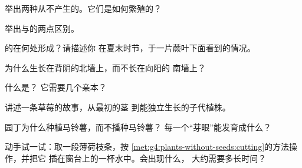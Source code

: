 \begin{exercise}[$\star$]\label{exo:g4:plants-without-seeds:1}
举出两种从不产生的。它们是如何繁殖的？
\end{exercise}

\begin{exercise}[$\star$]\label{exo:g4:plants-without-seeds:2}
举出与的两点区别。
\end{exercise}

\begin{exercise}[$\star$]\label{exo:g4:plants-without-seeds:3}
的在何处形成？请描述你
在夏末时节，于一片蕨叶下面看到的情况。
\end{exercise}

\begin{exercise}[$\star$]\label{exo:g4:plants-without-seeds:4}
为什么生长在背阴的北墙上，而不长在向阳的
南墙上？
\end{exercise}

\begin{exercise}[$\star$]\label{exo:g4:plants-without-seeds:5}
什么是？
它需要几个亲本？
\end{exercise}

\begin{exercise}[$\star$]\label{exo:g4:plants-without-seeds:6}
讲述一条草莓的故事，从最初的茎
到能独立生长的子代植株。
\end{exercise}

\begin{exercise}[$\star$]\label{exo:g4:plants-without-seeds:7}
园丁为什么种植马铃薯，而不播种马铃薯？
每一个“芽眼”能发育成什么？
\end{exercise}

\begin{exercise}[$\star$]\label{exo:g4:plants-without-seeds:8}
动手试一试：取一段薄荷枝条，按
\cref{met:g4:plants-without-seeds:cutting}的方法操作，并把它
插在窗台上的一杯水中。会出现什么，
大约需要多长时间？
\end{exercise}

